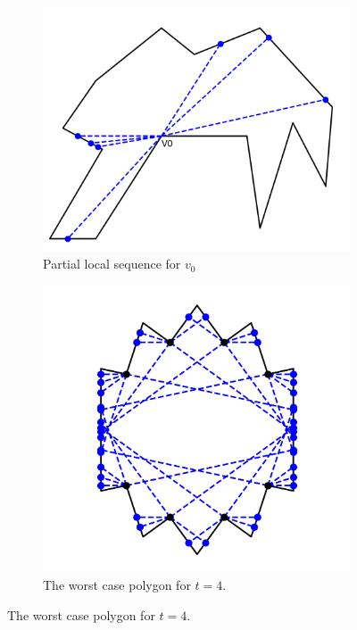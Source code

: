 \documentclass[]{styles/svproc}  %
\begin{document}
\begin{figure}[h]
\centering
\begin{subfigure}{0.4\textwidth}
    \centering
    \includegraphics[width=\linewidth]{figures/partial_local_sequence.png}
    \caption{Partial local sequence for $v_0$}\label{fig:pls}
\end{subfigure}%
\begin{subfigure}{0.4\textwidth}
    \centering
    \includegraphics[width=\linewidth]{figures/chestnut_5.png}
    \caption{The worst case polygon for $t=4$. \label{fig:t4}}
\end{subfigure}
\end{figure}
\end{document}
